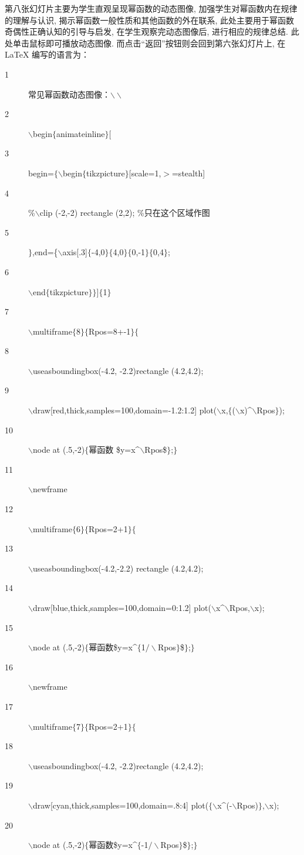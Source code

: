 第八张幻灯片主要为学生直观呈现幂函数的动态图像, 加强学生对幂函数内在规律的理解与认识, 揭示幂函数一般性质和其他函数的外在联系, 此处主要用于幂函数奇偶性正确认知的引导与启发, 在学生观察完动态图像后, 进行相应的规律总结. 此处单击鼠标即可播放动态图像. 而点击“返回”按钮则会回到第六张幻灯片上, 在\LaTeX{} 编写的语言为：
\begin{description}
  \item[1] 常见幂函数动态图像：$\backslash\backslash$
  \item[2]$\backslash$begin$\{$animateinline$\}$[
  \item[3]  begin=$\{\backslash$begin$\{$tikzpicture$\}$[scale=1,$>$=stealth]
  \item[4]  \%$\backslash$clip (-2,-2) rectangle (2,2); \%只在这个区域作图
  \item[5] $\}$,end=\{$\backslash$axis[.3]$\{$-4,0$\}\{$4,0$\}\{$0,-1$\}\{$0,4$\}$;
  \item[6] $\backslash$end$\{$tikzpicture$\}\}$]$\{$1$\}$
  \item[7] $\backslash$multiframe$\{$8$\}\{$Rpos=8+-1$\}\{$
  \item[8] $\backslash$useasboundingbox(-4.2, -2.2)rectangle (4.2,4.2);
  \item[9] $\backslash$draw[red,thick,samples=100,domain=-1.2:1.2]
            plot($\backslash$x,$\{$($\backslash$x)\^{}$\backslash$Rpos$\}$);
  \item[10] $\backslash$node at (.5,-2)$\{$幂函数
          \$y=x\^{}$\backslash$Rpos\$$\}$;$\}$
  \item[11] $\backslash$newframe
  \item[12] $\backslash$multiframe$\{$6$\}\{$Rpos=2+1$\}\{$
  \item[13] $\backslash$useasboundingbox(-4.2,-2.2) rectangle (4.2,4.2);
  \item[14] $\backslash$draw[blue,thick,samples=100,domain=0:1.2]
  plot($\backslash$x\^{}$\backslash$Rpos,$\backslash$x);
  \item[15] $\backslash$node at (.5,-2)$\{$幂函数\$y=x\^{}$\{$1$/\backslash$Rpos$\}$\$$\}$;$\}$
  \item[16] $\backslash$newframe
  \item[17] $\backslash$multiframe$\{$7$\}\{$Rpos=2+1$\}\{$
  \item[18] $\backslash$useasboundingbox(-4.2, -2.2)rectangle (4.2,4.2);
  \item[19] $\backslash$draw[cyan,thick,samples=100,domain=.8:4]
  plot($\{\backslash$x\^{}(-$\backslash$Rpos)$\}$,$\backslash$x);
  \item[20] $\backslash$node at (.5,-2)$\{$幂函数\$y=x\^{}$\{$-1$/\backslash$Rpos$\}$\$$\}$;$\}$

\end{description}
